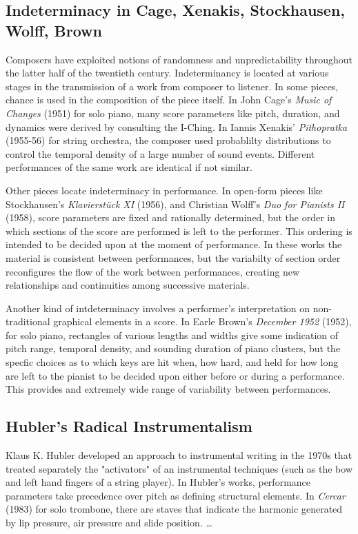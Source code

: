 \documentclass[11pt]{article}
\begin{document}
\subsection{Indeterminacy in Cage, Xenakis, Stockhausen, Wolff, Brown}
Composers have exploited notions of randomness and unpredictability throughout the latter half of the twentieth century. Indeterminancy is located at various stages in the transmission of a work from composer to listener. In some pieces, chance is used in the composition of the piece itself. In John Cage's \textit{Music of Changes} (1951) for solo piano, many score parameters like pitch, duration, and dynamics were derived by consulting the I-Ching. In Iannis Xenakis' \textit{Pithopratka} (1955-56) for string orchestra, the composer used probablilty distributions to control the temporal density of a large number of sound events. Different performances of the same work are identical if not similar.

Other pieces locate indeterminacy in performance. In open-form pieces like Stockhausen's \textit{Klavierstück XI} (1956), and Christian Wolff's \textit {Duo for Pianists II} (1958), score parameters are fixed and rationally determined, but the order in which sections of the score are performed is left to the performer. This ordering is intended to be decided upon at the moment of performance. In these works the material is consistent between performances, but the variabilty of section order reconfigures the flow of the work between performances, creating new relationships and continuities among successive materials.

Another kind of intdeterminacy involves a performer's interpretation on non-traditional graphical elements in a score. In Earle Brown's \textit {December 1952} (1952), for solo piano, rectangles of various lengths and widths give some indication of pitch range, temporal density, and sounding duration of piano clusters, but the specfic choices as to which keys are hit when, how hard, and held for how long are left to the pianist to be decided upon either before or during a performance. This provides and extremely wide range of variability between performances.

\subsection{Hubler's Radical Instrumentalism}
Klaus K. Hubler developed an approach to instrumental writing in the 1970s that treated separately the "activators" of an instrumental techniques (such as the bow and left hand fingers of a string player). In Hubler's works, performance parameters take precedence over pitch as defining structural elements. In \textit {Cercar} (1983) for solo trombone, there are staves that indicate the harmonic generated by lip pressure, air pressure and slide position.
\ldots
\end{document}
